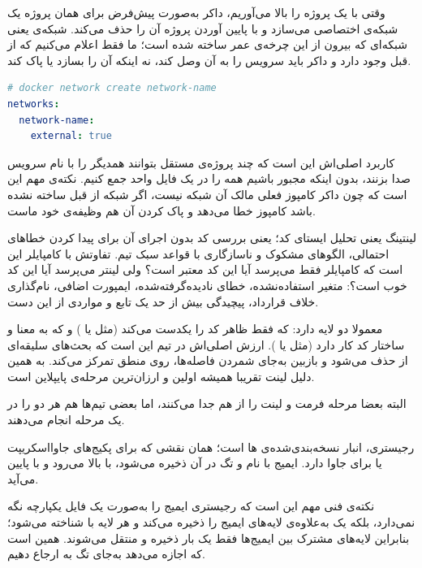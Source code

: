 
وقتی با  یک پروژه را بالا می‌آوریم، داکر به‌صورت پیش‌فرض برای همان پروژه یک شبکه‌ی اختصاصی می‌سازد و با پایین آوردن پروژه آن را حذف می‌کند. شبکه‌ی  یعنی شبکه‌ای که بیرون از این چرخه‌ی عمر ساخته شده است؛ ما فقط اعلام می‌کنیم که از قبل وجود دارد و داکر باید سرویس را به آن وصل کند، نه اینکه آن را بسازد یا پاک کند.

\begin{lstlisting}[language=Yaml]
# docker network create network-name
networks:
  network-name:
    external: true
\end{lstlisting}

کاربرد اصلی‌اش این است که چند پروژه‌ی  مستقل بتوانند همدیگر را با نام سرویس صدا بزنند، بدون اینکه مجبور باشیم همه را در یک فایل واحد جمع کنیم. نکته‌ی مهم این است که چون داکر کامپوز فعلی مالک آن شبکه نیست، اگر شبکه از قبل ساخته نشده باشد کامپوز خطا می‌دهد و پاک کردن آن هم وظیفه‌ی خود ماست.


لینتینگ یعنی تحلیل ایستای کد؛ یعنی بررسی کد بدون اجرای آن برای پیدا کردن خطاهای احتمالی، الگوهای مشکوک و ناسازگاری با قواعد سبک تیم. تفاوتش با کامپایلر این است که کامپایلر فقط می‌پرسد آیا این کد معتبر است؟ ولی لینتر می‌پرسد آیا این کد خوب است؟: متغیر استفاده‌نشده، خطای نادیده‌گرفته‌شده، ایمپورت اضافی، نام‌گذاری خلاف قرارداد، پیچیدگی بیش از حد یک تابع و مواردی از این دست.

معمولا دو لایه دارد:  که فقط ظاهر کد را یکدست می‌کند (مثل  یا ) و  که به معنا و ساختار کد کار دارد (مثل  یا ). ارزش اصلی‌اش در تیم این است که بحث‌های سلیقه‌ای از  حذف می‌شود و بازبین به‌جای شمردن فاصله‌ها، روی منطق تمرکز می‌کند. به همین دلیل لینت تقریبا همیشه اولین و ارزان‌ترین مرحله‌ی پایپلاین است.

البته بعضا مرحله فرمت و لینت را از هم جدا می‌کنند، اما بعضی تیم‌ها هم هر دو را در یک مرحله انجام می‌دهند.



رجیستری، انبار نسخه‌‌بندی‌شده‌ی ها است؛ همان نقشی که  برای پکیج‌های جاوااسکریپت یا  برای جاوا دارد. ایمیج با نام و تگ در آن ذخیره می‌شود، با  بالا می‌رود و با  پایین می‌آید.

نکته‌ی فنی مهم این است که رجیستری ایمیج را به‌صورت یک فایل یکپارچه نگه نمی‌دارد، بلکه یک  به‌علاوه‌ی لایه‌های ایمیج را ذخیره می‌کند و هر لایه با  شناخته می‌شود؛ بنابراین لایه‌های مشترک بین ایمیج‌ها فقط یک بار ذخیره و منتقل می‌شوند. همین  است که اجازه می‌دهد به‌جای تگ به  ارجاع دهیم.
